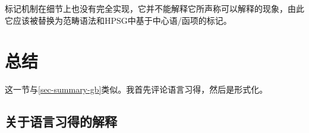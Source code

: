标记机制在细节上也没有完全实现，它并不能解释它所声称可以解释的现象，由此它应该被替换为范畴语法和HPSG中基于中心语/函项的标记。

\section{总结}

这一节与\ref{sec-summary-gb}类似。我首先评论语言习得，然后是形式化。

\subsection{关于语言习得的解释}

